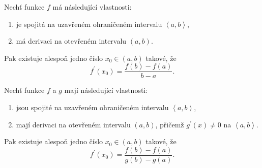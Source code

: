 \begin{veta}
Nechť funkce $f$ má následující vlastnosti:
\begin{enumerate}[$i.$]
\item je spojitá na uzavřeném ohraničeném intervalu $\left < a,b \right > $,
\item má derivaci na otevřeném intervalu $(a,b)$.
\end{enumerate}
Pak existuje alespoň jedno číslo $x_0\in (a,b)$ takové, že
$$f^\prime(x_0)=\frac{f(b)-f(a)}{b-a}.$$
\end{veta}

\begin{veta}
Nechť funkce $f$ a $g$ mají následující vlastnosti:
\begin{enumerate}[$i.$]
\item jsou spojité na uzavřeném ohraničeném intervalu $\left < a,b \right > $,
\item mají derivaci na otevřeném intervalu $(a,b)$, přičemž $g^\prime(x)\ne 0$ na $\left < a,b \right > $.
\end{enumerate}
Pak existuje alespoň jedno číslo $x_0\in (a,b)$ takové, že
$$f^\prime(x_0)=\frac{f(b)-f(a)}{g(b)-g(a)}.$$
\end{veta}
